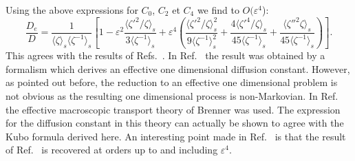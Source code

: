 \documentclass[pre,showpacs,preprintnumbers,amsmath,amssymb,superscriptaddress]{revtex4-1}
\begin{document}
{{Using the above expressions for $C_0$, $C_2$ et $C_4$ we find to $O(\varepsilon^4$):
\begin{equation}
\frac{D_e}{D} = \frac{1}{\langle \zeta \rangle_s \langle \zeta^{-1} \rangle_s} \left[ 1 - \varepsilon^2 \frac{\langle \zeta'^2/\zeta\rangle_s}{3 \langle \zeta^{-1} \rangle_s} +\varepsilon^4 \left( \frac{\langle \zeta'^2/\zeta\rangle_s^2}{9 \langle \zeta^{-1} \rangle_s^2} + \frac{4 \langle \zeta'^4/\zeta \rangle_s }{45 \langle \zeta^{-1} \rangle_s} + \frac{ \langle \zeta''^2\zeta\rangle_s}{45 \langle \zeta^{-1} \rangle_s} \right)\right].\label{o4}
\end{equation}
This agrees with the results of Refs.~\cite{kal2006,dorfman2014assessing}. In Ref.~\cite{kal2006} the result was obtained by a formalism which derives an effective one dimensional diffusion constant. However, as pointed out before, the reduction to an effective one dimensional problem is not obvious as the resulting one dimensional process is non-Markovian. In Ref.~\cite{dorfman2014assessing} the effective macroscopic transport theory of Brenner \cite{bre1993} was used. 
The expression for the diffusion constant in this theory can actually be shown to agree with the Kubo formula derived here. An interesting point made in Ref.~\cite{dorfman2014assessing} is that the result of Ref.~\cite{kal2006} is recovered at orders up to and including $\varepsilon^4$. 

}}
\end{document}
